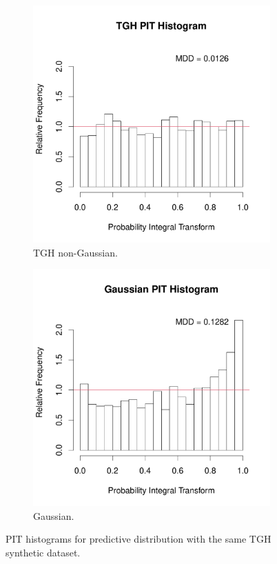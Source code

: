 \documentclass[conference]{IEEEtran}
\begin{document}
\begin{figure}[h]
\centering
\begin{subfigure}{.25\textwidth}
  \centering
  \includegraphics[width=\linewidth]{./figures/PIT_TGH.pdf}
   \caption{TGH non-Gaussian.}
\end{subfigure}%
\begin{subfigure}{.25\textwidth}
  \centering
  \includegraphics[width=\linewidth]{./figures/PIT_Gau.pdf}
  \caption{Gaussian.}
\end{subfigure}
  \caption{PIT histograms for predictive distribution with the same TGH synthetic dataset.}
  \label{fig:PIT_synthetic}
\end{figure}
\end{document}
